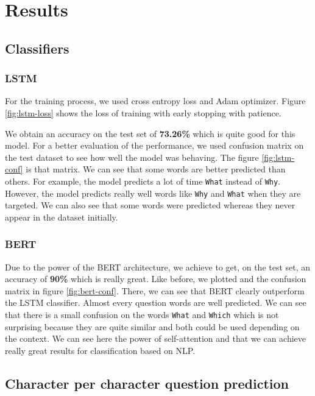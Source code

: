 \documentclass{article}
\begin{document}
\section{Results}

\subsection{Classifiers}

\subsubsection{LSTM}

For the training process, we used cross entropy loss and Adam optimizer. Figure \ref{fig:lstm-loss} shows the loss of training with early stopping with patience.

We obtain an accuracy on the test set of \textbf{73.26\%} which is quite good for this model. For a better evaluation of the performance, we used confusion matrix on the test dataset to see how well the model was behaving. The figure \ref{fig:lstm-conf} is that matrix. We can see that some words are better predicted than others. For example, the model predicts a lot of time \texttt{What} instead of \texttt{Why}. However, the model predicts really well words like \texttt{Why} and \texttt{What} when they are targeted. We can also see that some words were predicted whereas they never appear in the dataset initially.

\subsubsection{BERT}

Due to the power of the BERT architecture, we achieve to get, on the test set, an accuracy of \textbf{90\%} which is really great.
Like before, we plotted and the confusion matrix in figure \ref{fig:bert-conf}. There, we can see that BERT clearly outperform the LSTM classifier. Almost every question words are well predicted. We can see that there is a small confusion on the words \texttt{What} and \texttt{Which} which is not surprising because they are quite similar and both could be used depending on the context. We can see here the power of self-attention and that we can achieve really great results for classification based on NLP.

\subsection{Character per character question prediction}
\end{document}
